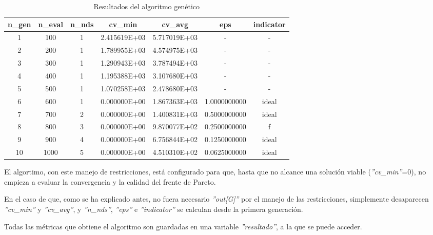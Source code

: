 \begin{table}[h!]
    \centering
    \small %
    \begin{tabularx}{\textwidth}{@{}ccccccc@{}}
        \toprule
        \textbf{n\_gen} & \textbf{n\_eval} & \textbf{n\_nds} & \textbf{cv\_min} & \textbf{cv\_avg} & \textbf{eps} & \textbf{indicator} \\ 
        \midrule
         1 &   100 &  1 & 2.415619E+03 & 5.717019E+03 &          - &          - \\ 
         2 &   200 &  1 & 1.789955E+03 & 4.574975E+03 &          - &          - \\ 
         3 &   300 &  1 & 1.290943E+03 & 3.787494E+03 &          - &          - \\ 
         4 &   400 &  1 & 1.195388E+03 & 3.107680E+03 &          - &          - \\ 
         5 &   500 &  1 & 1.070258E+03 & 2.478680E+03 &          - &          - \\ 
         6 &   600 &  1 & 0.000000E+00 & 1.867363E+03 & 1.0000000000 &     ideal \\ 
         7 &   700 &  2 & 0.000000E+00 & 1.400831E+03 & 0.5000000000 &     ideal \\ 
         8 &   800 &  3 & 0.000000E+00 & 9.870077E+02 & 0.2500000000 &         f \\ 
         9 &   900 &  4 & 0.000000E+00 & 6.756844E+02 & 0.1250000000 &     ideal \\ 
        10 &  1000 &  5 & 0.000000E+00 & 4.510310E+02 & 0.0625000000 &     ideal \\ 
        \bottomrule
    \end{tabularx}
    \caption{Resultados del algoritmo genético}
    \label{tab:optimizacion}
\end{table}
\newpage
El algortimo, con este manejo de restricciones, está configurado para que, hasta que no alcance una solución viable (\textit{''cv\_min''}=0), no empieza a evaluar la convergencia y la calidad del frente de Pareto.

En el caso de que, como se ha explicado antes, no fuera necesario \textit{''out[G]''} por el manejo de las restricciones, simplemente desaparecen \textit{''cv\_min''} y \textit{''cv\_avg''}, y \textit{''n\_nds''}, \textit{''eps''} e \textit{''indicator''} se calculan desde la primera generación.

Todas las métricas que obtiene el algoritmo son guardadas en una variable \textit{''resultado''}, a la que se puede acceder.

